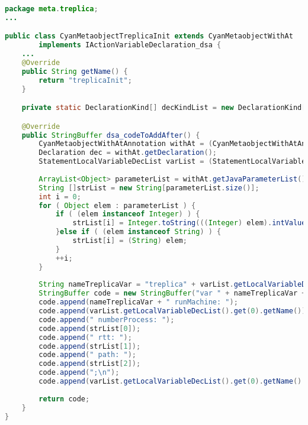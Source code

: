 \newpage

\begin{lstlisting}[basicstyle=\tiny, language=Java, caption={Código Fonte de \textbf{CyanMetaobjectTreplicaInit}}, label={cod:MetaInitFonte}]
package meta.treplica;
...

public class CyanMetaobjectTreplicaInit extends CyanMetaobjectWithAt
		implements IActionVariableDeclaration_dsa {
	...
	@Override
	public String getName() {
		return "treplicaInit";
	}

	private static DeclarationKind[] decKindList = new DeclarationKind[] { DeclarationKind.LOCAL_VAR_DEC };

	@Override
	public StringBuffer dsa_codeToAddAfter() {
		CyanMetaobjectWithAtAnnotation withAt = (CyanMetaobjectWithAtAnnotation) this.getMetaobjectAnnotation();
		Declaration dec = withAt.getDeclaration();
		StatementLocalVariableDecList varList = (StatementLocalVariableDecList) dec;
		
		ArrayList<Object> parameterList = withAt.getJavaParameterList();
		String []strList = new String[parameterList.size()];
		int i = 0;
		for ( Object elem : parameterList ) {
			if ( (elem instanceof Integer) ) {
				strList[i] = Integer.toString(((Integer) elem).intValue());
			}else if ( (elem instanceof String) ) {
				strList[i] = (String) elem;
			}
			++i;
		}
		
		String nameTreplicaVar = "treplica" + varList.getLocalVariableDecList().get(0).getName();
		StringBuffer code = new StringBuffer("var " + nameTreplicaVar + " = Treplica new;\n");
		code.append(nameTreplicaVar + " runMachine: ");
		code.append(varList.getLocalVariableDecList().get(0).getName());
		code.append(" numberProcess: ");
		code.append(strList[0]); 
		code.append(" rtt: ");
		code.append(strList[1]); 
		code.append(" path: ");
		code.append(strList[2]); 
		code.append(";\n");
		code.append(varList.getLocalVariableDecList().get(0).getName() + " setTreplica: " + nameTreplicaVar + ";\n");
		
		return code;
	}
}
\end{lstlisting}
